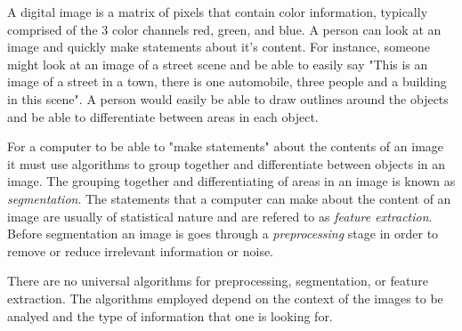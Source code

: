 A digital image is a matrix of pixels that contain color information, typically comprised of the 3 color channels red, green, and blue. A person can look at an image and quickly make statements about it's content. For instance, someone might look at an image of a street scene and be able to easily say "This is an image of a street in a town, there is one automobile, three people and a building in this scene". A person would easily be able to draw outlines around the objects and be able to differentiate between areas in each object.

For a computer to be able to "make statements" about the contents of an image it must use algorithms to group together and differentiate between objects in an image. The grouping together and differentiating of areas in an image is known as \textit{segmentation}. The statements that a computer can make about the content of an image are usually of statistical nature and are refered to as \textit{feature extraction}. Before segmentation an image is goes through a \textit{preprocessing} stage in order to remove or reduce irrelevant information or noise.

There are no universal algorithms for preprocessing, segmentation, or feature extraction. The algorithms employed depend on the context of the images to be analyed and the type of information that one is looking for.






